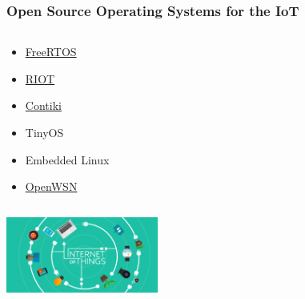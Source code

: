 \documentclass{beamer}
\begin{document}
\begin{frame}
	\frametitle{Open Source Operating Systems for the IoT}
	\begin{columns}[c]
		\begin{column}{30cm}
			\vspace{.1cm}
			\begin{itemize}
				\justifying
				\item \textcolor{blue}{\href{http://www.freertos.org}{FreeRTOS}}
				\item \textcolor{blue}{\href{http://www.riot-os.org}{RIOT}}
				\item \textcolor{blue}{\href{http://www.contiki-os.org}{Contiki}}
				\item TinyOS
				\item Embedded Linux
				\item \textcolor{blue}{\href{http://www.openwsn.org}{OpenWSN}}
			\end{itemize}
		\end{column}
	\end{columns}
	\vspace{.5cm}
	\hspace*{5.5cm} \includegraphics[width=5cm]{figs/Internet-of-Things-2.jpg}
\end{frame}
\end{document}
